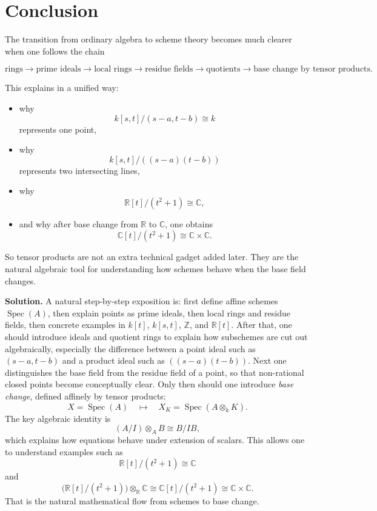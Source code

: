 \documentclass[12pt,a4paper]{article}
\theoremstyle{notespace}
\newcommand{\Spec}{\operatorname{Spec}}
\newcommand{\Z}{\mathbb Z}
\newcommand{\R}{\mathbb R}
\newcommand{\C}{\mathbb C}
\theoremstyle{definition}
\begin{document}
	\section{Conclusion}
	
	The transition from ordinary algebra to scheme theory becomes much clearer when one follows the chain
	
	\[
	\text{rings}
	\longrightarrow
	\text{prime ideals}
	\longrightarrow
	\text{local rings}
	\longrightarrow
	\text{residue fields}
	\longrightarrow
	\text{quotients}
	\longrightarrow
	\text{base change by tensor products}.
	\]
	
	This explains in a unified way:
	
	\begin{itemize}[leftmargin=2em]
		\item why
		\[
		k[s,t]/(s-a,t-b)\cong k
		\]
		represents one point,
		
		\item why
		\[
		k[s,t]/((s-a)(t-b))
		\]
		represents two intersecting lines,
		
		\item why
		\[
		\R[t]/(t^2+1)\cong \C,
		\]
		
		\item and why after base change from \(\R\) to \(\C\), one obtains
		\[
		\C[t]/(t^2+1)\cong \C\times \C.
		\]
	\end{itemize}
	
	So tensor products are not an extra technical gadget added later.  
	They are the natural algebraic tool for understanding how schemes behave when the base field changes.
	
	\medskip
	
	\textbf{Solution.}
	A natural step-by-step exposition is:
	first define affine schemes \(\Spec(A)\), then explain points as prime ideals, then local rings and residue fields, then concrete examples in \(k[t]\), \(k[s,t]\), \(\Z\), and \(\R[t]\). After that, one should introduce ideals and quotient rings to explain how subschemes are cut out algebraically, especially the difference between a point ideal such as \((s-a,t-b)\) and a product ideal such as \(((s-a)(t-b))\). Next one distinguishes the base field from the residue field of a point, so that non-rational closed points become conceptually clear. Only then should one introduce \emph{base change}, defined affinely by tensor products:
	\[
	X=\Spec(A)\quad\mapsto\quad X_K=\Spec(A\otimes_k K).
	\]
	The key algebraic identity is
	\[
	(A/I)\otimes_A B\cong B/IB,
	\]
	which explains how equations behave under extension of scalars. This allows one to understand examples such as
	\[
	\R[t]/(t^2+1)\cong \C
	\]
	and
	\[
	\bigl(\R[t]/(t^2+1)\bigr)\otimes_{\R}\C
	\cong
	\C[t]/(t^2+1)
	\cong
	\C\times \C.
	\]
	That is the natural mathematical flow from schemes to base change.
\end{document}
